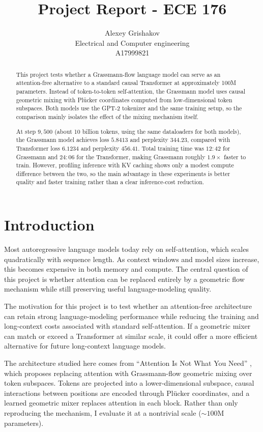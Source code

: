 \documentclass{article}
\title{Project Report - ECE 176}
\author{%
  Alexey Grishakov\\
  Electrical and Computer engineering\\
  A17999821\\
}
\begin{document}
\maketitle

\begin{abstract}
This project tests whether a Grassmann-flow language model can serve as an attention-free alternative to a standard causal Transformer at approximately 100M parameters. Instead of token-to-token self-attention, the Grassmann model uses causal geometric mixing with Pl\"ucker coordinates computed from low-dimensional token subspaces. Both models use the GPT-2 tokenizer and the same training setup, so the comparison mainly isolates the effect of the mixing mechanism itself.

At step \(9{,}500\) (about 10 billion tokens, using the same dataloaders for both models), the Grassmann model achieves loss \(5.8413\) and perplexity \(344.23\), compared with Transformer loss \(6.1234\) and perplexity \(456.41\). Total training time was \(12{:}42\) for Grassmann and \(24{:}06\) for the Transformer, making Grassmann roughly \(1.9\times\) faster to train. However, profiling inference with KV caching shows only a modest compute difference between the two, so the main advantage in these experiments is better quality and faster training rather than a clear inference-cost reduction.
\end{abstract}

\section{Introduction}

Most autoregressive language models today rely on self-attention, which scales quadratically with sequence length. As context windows and model sizes increase, this becomes expensive in both memory and compute. The central question of this project is whether attention can be replaced entirely by a geometric flow mechanism while still preserving useful language-modeling quality.

The motivation for this project is to test whether an attention-free architecture can retain strong language-modeling performance while reducing the training and long-context costs associated with standard self-attention. If a geometric mixer can match or exceed a Transformer at similar scale, it could offer a more efficient alternative for future long-context language models.

The architecture studied here comes from ``Attention Is Not What You Need'' \cite{chong2025attentionneed}, which proposes replacing attention with Grassmann-flow geometric mixing over token subspaces. Tokens are projected into a lower-dimensional subspace, causal interactions between positions are encoded through Pl\"ucker coordinates, and a learned geometric mixer replaces attention in each block. Rather than only reproducing the mechanism, I evaluate it at a nontrivial scale (\(\sim\!100\)M parameters).
\end{document}
